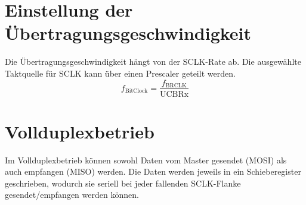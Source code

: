\documentclass[a4paper, 11pt]{article}
\begin{document}
  \section{Einstellung der Übertragungsgeschwindigkeit}
  Die Übertragungsgeschwindigkeit hängt von der SCLK-Rate ab. Die ausgewählte
  Taktquelle für SCLK kann über einen Prescaler geteilt werden.
  \[f_{\mathrm{BitClock}} = \frac{f_{\mathrm{BRCLK}}}{\mathrm{UCBRx}}\]

  \section{Vollduplexbetrieb}
  Im Vollduplexbetrieb können sowohl Daten vom Master gesendet (MOSI) als auch
  empfangen (MISO) werden. Die Daten werden jeweils in ein Schieberegister
  geschrieben, wodurch sie seriell bei jeder fallenden SCLK-Flanke gesendet/empfangen werden können.
\end{document}
